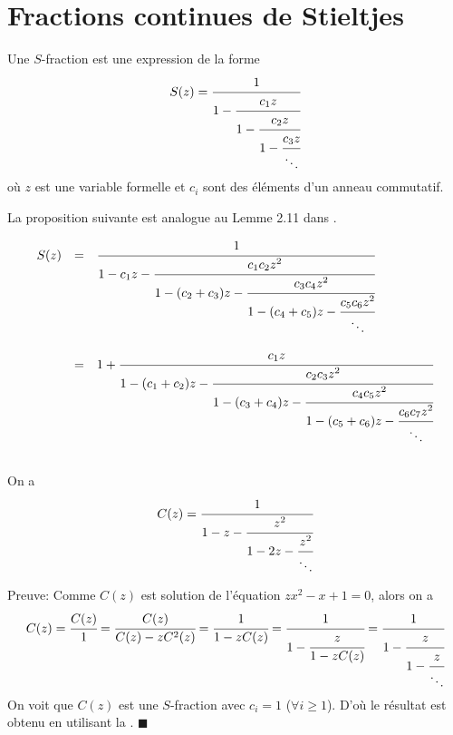 \section{Fractions continues de Stieltjes}
\begin{definition}
	\begin{rm}
		Une $S$-fraction est une expression de la forme
		\[
			S(z)=\cfrac{1}{1-\cfrac{c_{1}z}{1-\cfrac{c_{2}z}{1-\cfrac{c_{3}z}{\ddots}}}}
		\]
		où $z$ est une variable formelle et $c_{i}$ sont des éléments d'un anneau commutatif.
	\end{rm}
\end{definition}
La proposition suivante est analogue au Lemme 2.11 dans \cite{ref30}.
\begin{proposition}\label{j-frac}
	\begin{rm}
		\[
			\begin{array}{l l l}

				S(z) & =       & \cfrac{1}{1-c_{1}z-\cfrac{c_{1}c_{2}z^2}{1-(c_{2}+c_{3})z-\cfrac{c_{3}c_{4}z^2}{1-(c_{4}+c_{5})z-\cfrac{c_{5}c_{6}z^2}{\ddots}}}}                \\
				     & \text{} &                                                                                                                                                  \\

				     & =       & 1+\cfrac{c_{1}z}{1-(c_{1}+c_{2})z-\cfrac{c_{2}c_{3}z^2}{1-(c_{3}+c_{4})z-\cfrac{c_{4}c_{5}z^2}{1-(c_{5}+c_{6})z-\cfrac{c_{6}c_{7}z^2}{\ddots}}}} \\
				     & \text{} &
			\end{array}
		\]
	\end{rm}
\end{proposition}

\begin{proposition}\label{cat-frac}
	On a
	\[C(z) = \cfrac{1}{1-z-\cfrac{z^2}{1-2z-\cfrac{z^2}{\ddots}}} \]
\end{proposition}
Preuve:
Comme $C(z)$ est solution de l'équation $zx^{2} - x +1 =0$, alors on a
\[
	C(z) = \cfrac{C(z)}{1}=\cfrac{C(z)}{C(z)-zC^2(z)}=\cfrac{1}{1-zC(z)}= \cfrac{1}{1-\cfrac{z}{1-zC(z)}} = \cfrac{1}{1-\cfrac{z}{1-\cfrac{z}{\ddots}}}
\]
On voit que $C(z)$ est une $S$-fraction avec $c_{i}=1$ ($\forall i \geq 1$).
D'où le résultat est obtenu en utilisant la . \hspace{10pt} $\blacksquare$

